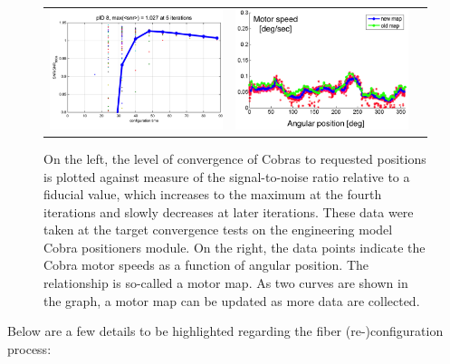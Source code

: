 \documentclass[a4paper]{article}
\begin{document}
\begin{figure}
  \begin{center}
    \begin{tabular}{ccc} %
      \includegraphics[width=7.5cm]{./figures/cobra-sn.png} &
      \includegraphics[width=7.5cm]{./figures/cobra-motormap.png} \\
    \end{tabular}
  \end{center}
  \caption{ \label{fig:cobraperformance} On the left, the level of
    convergence of Cobras to requested positions is plotted against
    measure of the signal-to-noise ratio relative to a fiducial value,
    which increases to the maximum at the fourth iterations and slowly
    decreases at later iterations. These data were taken at the target
    convergence tests on the engineering model Cobra positioners
    module. On the right, the data points indicate the Cobra motor
    speeds as a function of angular position. The relationship is
    so-called a motor map. As two curves are shown in the graph, a
    motor map can be updated as more data are collected.}
\end{figure}

Below are a few details to be highlighted regarding the fiber
(re-)configuration process:
\end{document}
